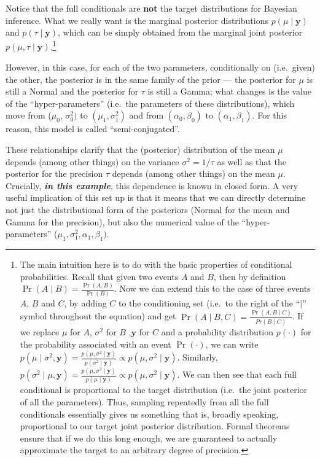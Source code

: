 \documentclass[
]{article}
\begin{document}
Notice that the full conditionals are \textbf{not} the target
distributions for Bayesian inference. What we really want is the
marginal posterior distributions \(p(\mu \mid \boldsymbol{y} )\) and
\(p(\tau \mid \boldsymbol{y})\), which can be simply obtained from the
marginal joint posterior
\(p(\mu, \tau \mid \boldsymbol{y} )\).\footnote{The main intuition here
  is to do with the basic properties of conditional probabilities.
  Recall that given two events \(A\) and \(B\), then by definition
  \(\Pr(A \mid B) = \frac{\Pr(A,B)}{\Pr(B)}\). Now we can extend this to
  the case of three events \(A\), \(B\) and \(C\), by adding \(C\) to
  the conditioning set (i.e.~to the right of the ``\(\mid\)'' symbol
  throughout the equation) and get
  \(\Pr(A \mid B, C ) = \frac{\Pr(A,B\mid C)}{Pr(B\mid C)}\). If we
  replace \(\mu\) for \(A\), \(\sigma^2\) for \(B\) ,\(\boldsymbol{y}\)
  for \(C\) and a probability distribution \(p(\cdot)\) for the
  probability associated with an event \(\Pr(\cdot)\), we can write
  \(p(\mu \mid \sigma^2, \boldsymbol{y} ) = \frac{p(\mu,\sigma^2\mid \boldsymbol{y})}{p(\sigma^2\mid \boldsymbol{y})}\propto p(\mu, \sigma^2 \mid \boldsymbol{y} )\).
  Similarly,
  \(p(\sigma^2 \mid \mu, \boldsymbol{y}) = \frac{p(\mu,\sigma^2\mid\boldsymbol{y})}{p(\mu\mid\boldsymbol{y})} \propto p(\mu,\sigma^2\mid\boldsymbol{y})\).
  We can then see that each full conditional is proportional to the
  target distribution (i.e.~the joint posterior of all the parameters).
  Thus, sampling repeatedly from all the full conditionals essentially
  gives us something that is, broadly speaking, proportional to our
  target joint posterior distribution. Formal theorems ensure that if we
  do this long enough, we are guaranteed to actually approximate the
  target to an arbitrary degree of precision.}

However, in this case, for each of the two parameters, conditionally on
(i.e.~given) the other, the posterior is in the same family of the prior
--- the posterior for \(\mu\) is still a Normal and the posterior for
\(\tau\) is still a Gamma; what changes is the value of the
``hyper-parameters'' (i.e.~the parameters of these distributions), which
move from (\(\mu_0\), \(\sigma_0^2)\) to \((\mu_1 , \sigma_1^2 )\) and
from \((\alpha_0, \beta_0 )\) to \((\alpha_1 , \beta_1)\). For this
reason, this model is called ``semi-conjugated''.

These relationships clarify that the (posterior) distribution of the
mean \(\mu\) depends (among other things) on the variance
\(\sigma^2 = 1/\tau\) as well as that the posterior for the precision
\(\tau\) depends (among other things) on the mean \(\mu\). Crucially,
\textbf{\emph{in this example}}, this dependence is known in closed
form. A very useful implication of this set up is that it means that we
can directly determine not just the distributional form of the
posteriors (Normal for the mean and Gamma for the precision), but also
the numerical value of the ``hyper-parameters''
(\(\mu_1, \sigma_1^2 , \alpha_1,\beta_1 )\).
\end{document}
